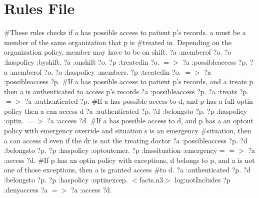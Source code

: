 \documentclass[conference]{IEEEtran}
\begin{document}
\section{Rules File}
\label{sec:rules-file}

\#These rules checks if a has possible access to patient p's records. a must be a member of the same organization that p is \newline
\#treated in. Depending on the organization policy, member may have to be on shift. \newline 
\newline
{?a :memberof ?o. ?o :haspolicy :byshift. ?a :onshift ?o. ?p :treatedin ?o.} $=>$ {?a :possibleaccess ?p}.\newline 
\newline
{?a :memberof ?o. ?o :haspolicy :members. ?p :treatedin ?o.}  $=>$ {?a :possibleaccess ?p}.\newline
\newline
\#If a has possible access to patient p's records, and a treats p then a is authenticated to access p's records \newline
\newline
{?a :possibleaccess ?p. ?a :treats ?p.}  $=>$ {?a :authenticated ?p}.\newline 
\newline
\#If a has possible access to d, and p has a full optin policy then a can access d \newline
\newline
{?a :authenticated ?p. ?d :belongsto ?p. ?p :haspolicy :optin. }  $=>$ {?a :access ?d}.\newline
\newline
\#If a has possible access to d, and p has a an optout policy with emergency override and situation s is an emergency \newline
\#situation, then a can access d even if the dr is not the treating doctor \newline
\newline
{?a :possibleaccess ?p. ?d :belongsto ?p. ?p :haspolicy :optoutemer. ?p :hassituation :emergency} = $=>$ {?a :access ?d}. \newline
\newline
\#If p has an optin policy with exceptions, d belongs to p, and a is not one of those exceptions, then a is granted access\newline
\#to d. \newline
\newline
{?a :authenticated ?p. ?d :belongsto ?p. ?p :haspolicy :optinexcep. $<$facts.n3$>$ log:notIncludes {?p :denyaccess ?a}}  $=>$ {?a :access ?d}. \newline
\end{document}
